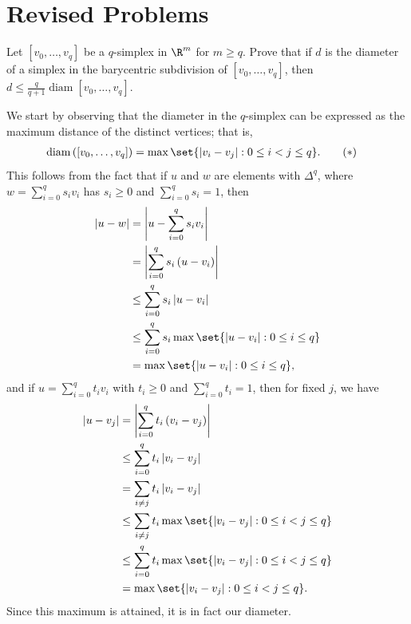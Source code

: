 \documentclass[10pt]{mypackage}
\begin{document}
\RaggedRight
\section{Revised Problems}%
\begin{problem}
  Let $\left[ v_0,\dots,v_q \right]$ be a $q$-simplex in $\R^m$ for $m\geq q$. Prove that if $d$ is the diameter of a simplex in the barycentric subdivision of $\left[ v_0,\dots,v_q \right]$, then $d\leq \frac{q}{q+1}\operatorname{diam}\left[ v_0,\dots,v_q \right]$.
\end{problem}
\begin{solution}
  We start by observing that the diameter in the $q$-simplex can be expressed as the maximum distance of the distinct vertices; that is,
  \begin{align*}
    \operatorname{diam}\left( \left[ v_0,\dots,v_q \right] \right) &= \max\set{\left\vert v_i-v_j \right\vert : 0\leq i < j \leq q}.\label{eq:diam_simplex}\tag{$\ast$}
  \end{align*}
  This follows from the fact that if $u$ and $w$ are elements with $\Delta^q$, where $w = \sum_{i=0}^{q}s_iv_i$ has $s_i\geq 0$ and $\sum_{i=0}^{q}s_i = 1$, then
  \begin{align*}
    \left\vert u-w \right\vert &= \left\vert u-\sum_{i=0}^{q}s_iv_i \right\vert\\
                               &= \left\vert \sum_{i=0}^{q}s_i\left( u-v_i \right) \right\vert\\
                               &\leq \sum_{i=0}^{q} s_i \left\vert u-v_i \right\vert\\
                               &\leq \sum_{i=0}^{q} s_i \max\set{\left\vert u-v_i \right\vert : 0\leq i \leq q}\\
                               &= \max\set{\left\vert u-v_i \right\vert : 0\leq i \leq q},
  \end{align*}
  and if $u = \sum_{i=0}^{q}t_iv_i$ with $t_i\geq 0$ and $\sum_{i=0}^{q}t_i = 1$, then for fixed $j$, we have
  \begin{align*}
    \left\vert u-v_j \right\vert &= \left\vert \sum_{i=0}^{q}t_i\left( v_i-v_j \right) \right\vert\\
                                 &\leq \sum_{i=0}^{q} t_i \left\vert v_i-v_j \right\vert\\
                                 &= \sum_{i\neq j} t_i \left\vert v_i-v_j \right\vert\\
                                 &\leq \sum_{i\neq j} t_i \max\set{\left\vert v_i-v_j \right\vert : 0\leq i < j \leq q}\\
                                 &\leq \sum_{i=0}^{q}t_i \max\set{ \left\vert v_i-v_j \right\vert : 0\leq i < j \leq q }\\
                                 &= \max\set{\left\vert v_i-v_j \right\vert : 0\leq i < j \leq q}.
  \end{align*}
  Since this maximum is attained, it is in fact our diameter.


\end{solution}
\end{document}
